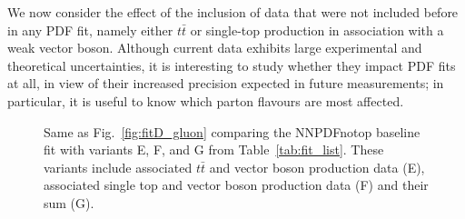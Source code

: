 \documentclass[withindex,glossary]{cam-thesis}
\begin{document}
We now consider the effect of the inclusion of data that were not included before in any PDF fit, namely either $t\bar{t}$ or single-top production in association with a weak vector boson.
%
Although current data exhibits large experimental and theoretical uncertainties, it is interesting to
study whether  they impact PDF fits at all, in view of their increased precision expected in future measurements; in particular, it is useful to know which parton flavours are most affected.

\begin{figure}[t]
\centering
        \caption{Same as Fig.~\ref{fig:fitD_gluon} comparing the NNPDFnotop
          baseline fit with variants E, F, and G from Table~\ref{tab:fit_list}.
          These variants include associated $t\bar{t}$ and vector boson
          production data (E), associated single top and vector boson
          production data (F) and their sum (G).
        }
\label{fig:fitEFG}
\end{figure}
\end{document}
